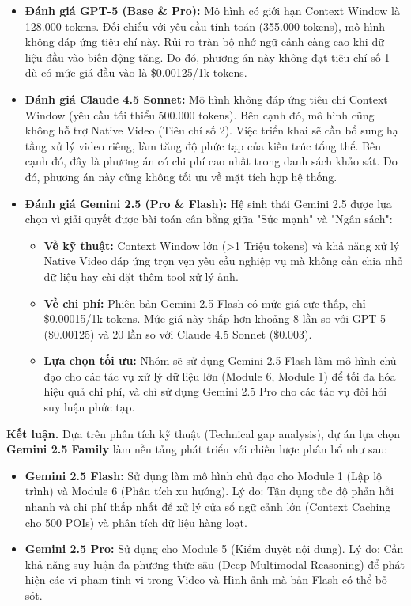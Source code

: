 \begin{itemize}
    \item \textbf{Đánh giá GPT-5 (Base \& Pro):} Mô hình có giới hạn Context Window là 128.000 tokens. Đối chiếu với yêu cầu tính toán (355.000 tokens), mô hình không đáp ứng tiêu chí này. Rủi ro tràn bộ nhớ ngữ cảnh càng cao khi dữ liệu đầu vào biến động tăng. Do đó, phương án này không đạt tiêu chí số 1 dù có mức giá đầu vào là \$0.00125/1k tokens.

    \item \textbf{Đánh giá Claude 4.5 Sonnet:} Mô hình không đáp ứng tiêu chí Context Window (yêu cầu tối thiểu 500.000 tokens). Bên cạnh đó, mô hình cũng không hỗ trợ Native Video (Tiêu chí số 2). Việc triển khai sẽ cần bổ sung hạ tầng xử lý video riêng, làm tăng độ phức tạp của kiến trúc tổng thể. Bên cạnh đó, đây là phương án có chi phí cao nhất trong danh sách khảo sát. Do đó, phương án này cũng không tối ưu về mặt tích hợp hệ thống.

    \item \textbf{Đánh giá Gemini 2.5 (Pro \& Flash):} Hệ sinh thái Gemini 2.5 được lựa chọn vì giải quyết được bài toán cân bằng giữa "Sức mạnh" và "Ngân sách":
    \begin{itemize}
        \item \textbf{Về kỹ thuật:} Context Window lớn (>1 Triệu tokens) và khả năng xử lý Native Video đáp ứng trọn vẹn yêu cầu nghiệp vụ mà không cần chia nhỏ dữ liệu hay cài đặt thêm tool xử lý ảnh.
        \item \textbf{Về chi phí:} Phiên bản Gemini 2.5 Flash có mức giá cực thấp, chỉ \$0.00015/1k tokens. Mức giá này thấp hơn khoảng 8 lần so với GPT-5 (\$0.00125) và 20 lần so với Claude 4.5 Sonnet (\$0.003).
        \item \textbf{Lựa chọn tối ưu:} Nhóm sẽ sử dụng Gemini 2.5 Flash làm mô hình chủ đạo cho các tác vụ xử lý dữ liệu lớn (Module 6, Module 1) để tối đa hóa hiệu quả chi phí, và chỉ sử dụng Gemini 2.5 Pro cho các tác vụ đòi hỏi suy luận phức tạp.
    \end{itemize}
\end{itemize}

\textbf{Kết luận.} Dựa trên phân tích kỹ thuật (Technical gap analysis), dự án lựa chọn \textbf{Gemini 2.5 Family} làm nền tảng phát triển với chiến lược phân bổ như sau:

\begin{itemize}
    \item \textbf{Gemini 2.5 Flash:} Sử dụng làm mô hình chủ đạo cho Module 1 (Lập lộ trình) và Module 6 (Phân tích xu hướng). Lý do: Tận dụng tốc độ phản hồi nhanh và chi phí thấp nhất để xử lý cửa sổ ngữ cảnh lớn (Context Caching cho 500 POIs) và phân tích dữ liệu hàng loạt.
    
    \item \textbf{Gemini 2.5 Pro:} Sử dụng cho Module 5 (Kiểm duyệt nội dung). Lý do: Cần khả năng suy luận đa phương thức sâu (Deep Multimodal Reasoning) để phát hiện các vi phạm tinh vi trong Video và Hình ảnh mà bản Flash có thể bỏ sót.
\end{itemize}
